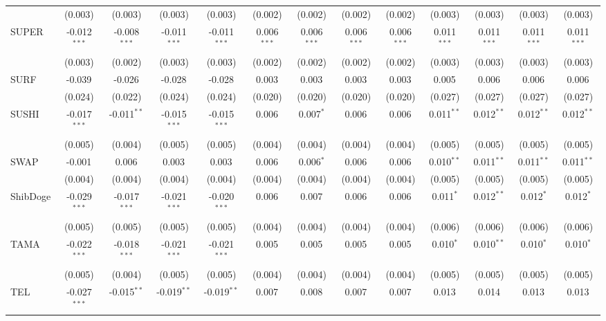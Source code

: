 \begin{table}[!htbp]
\begin{tabular}{@{\extracolsep{5pt}}lcccccccccccc}
  & (0.003) & (0.003) & (0.003) & (0.003) & (0.002) & (0.002) & (0.002) & (0.002) & (0.003) & (0.003) & (0.003) & (0.003) \\
 SUPER & -0.012$^{***}$ & -0.008$^{***}$ & -0.011$^{***}$ & -0.011$^{***}$ & 0.006$^{***}$ & 0.006$^{***}$ & 0.006$^{***}$ & 0.006$^{***}$ & 0.011$^{***}$ & 0.011$^{***}$ & 0.011$^{***}$ & 0.011$^{***}$ \\
  & (0.003) & (0.002) & (0.003) & (0.003) & (0.002) & (0.002) & (0.002) & (0.002) & (0.003) & (0.003) & (0.003) & (0.003) \\
 SURF & -0.039$^{}$ & -0.026$^{}$ & -0.028$^{}$ & -0.028$^{}$ & 0.003$^{}$ & 0.003$^{}$ & 0.003$^{}$ & 0.003$^{}$ & 0.005$^{}$ & 0.006$^{}$ & 0.006$^{}$ & 0.006$^{}$ \\
  & (0.024) & (0.022) & (0.024) & (0.024) & (0.020) & (0.020) & (0.020) & (0.020) & (0.027) & (0.027) & (0.027) & (0.027) \\
 SUSHI & -0.017$^{***}$ & -0.011$^{**}$ & -0.015$^{***}$ & -0.015$^{***}$ & 0.006$^{}$ & 0.007$^{*}$ & 0.006$^{}$ & 0.006$^{}$ & 0.011$^{**}$ & 0.012$^{**}$ & 0.012$^{**}$ & 0.012$^{**}$ \\
  & (0.005) & (0.004) & (0.005) & (0.005) & (0.004) & (0.004) & (0.004) & (0.004) & (0.005) & (0.005) & (0.005) & (0.005) \\
 SWAP & -0.001$^{}$ & 0.006$^{}$ & 0.003$^{}$ & 0.003$^{}$ & 0.006$^{}$ & 0.006$^{*}$ & 0.006$^{}$ & 0.006$^{}$ & 0.010$^{**}$ & 0.011$^{**}$ & 0.011$^{**}$ & 0.011$^{**}$ \\
  & (0.004) & (0.004) & (0.004) & (0.004) & (0.004) & (0.004) & (0.004) & (0.004) & (0.005) & (0.005) & (0.005) & (0.005) \\
 ShibDoge & -0.029$^{***}$ & -0.017$^{***}$ & -0.021$^{***}$ & -0.020$^{***}$ & 0.006$^{}$ & 0.007$^{}$ & 0.006$^{}$ & 0.006$^{}$ & 0.011$^{*}$ & 0.012$^{**}$ & 0.012$^{*}$ & 0.012$^{*}$ \\
  & (0.005) & (0.005) & (0.005) & (0.005) & (0.004) & (0.004) & (0.004) & (0.004) & (0.006) & (0.006) & (0.006) & (0.006) \\
 TAMA & -0.022$^{***}$ & -0.018$^{***}$ & -0.021$^{***}$ & -0.021$^{***}$ & 0.005$^{}$ & 0.005$^{}$ & 0.005$^{}$ & 0.005$^{}$ & 0.010$^{*}$ & 0.010$^{**}$ & 0.010$^{*}$ & 0.010$^{*}$ \\
  & (0.005) & (0.004) & (0.005) & (0.005) & (0.004) & (0.004) & (0.004) & (0.004) & (0.005) & (0.005) & (0.005) & (0.005) \\
 TEL & -0.027$^{***}$ & -0.015$^{**}$ & -0.019$^{**}$ & -0.019$^{**}$ & 0.007$^{}$ & 0.008$^{}$ & 0.007$^{}$ & 0.007$^{}$ & 0.013$^{}$ & 0.014$^{}$ & 0.013$^{}$ & 0.013$^{}$ \\

\end{tabular}
\end{table}
